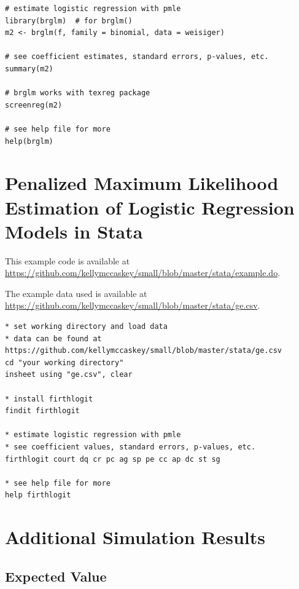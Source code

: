 \documentclass[12pt]{article}
\begin{document}
\begin{appendix}
\begin{footnotesize}
\begin{verbatim}
# estimate logistic regression with pmle
library(brglm)  # for brglm()
m2 <- brglm(f, family = binomial, data = weisiger)

# see coefficient estimates, standard errors, p-values, etc.
summary(m2)

# brglm works with texreg package
screenreg(m2)

# see help file for more
help(brglm)
\end{verbatim}
\end{footnotesize}

\section{Penalized Maximum Likelihood Estimation of Logistic Regression Models in Stata}\label{sec:pmle-in-stata}

This example code is available at \href{https://github.com/kellymccaskey/small/blob/master/stata/example.do}{https://github.com/kellymccaskey/small/blob/master/stata/example.do}.

\noindent The example data used is available at \href{https://github.com/kellymccaskey/small/blob/master/stata/GE.dta}{https://github.com/kellymccaskey/small/blob/master/stata/ge.csv}.

\begin{footnotesize}
\begin{verbatim}
* set working directory and load data
* data can be found at https://github.com/kellymccaskey/small/blob/master/stata/ge.csv
cd "your working directory"
insheet using "ge.csv", clear

* install firthlogit
findit firthlogit

* estimate logistic regression with pmle 
* see coefficient values, standard errors, p-values, etc.
firthlogit court dq cr pc ag sp pe cc ap dc st sg 

* see help file for more 
help firthlogit

\end{verbatim}
\end{footnotesize}


\section{Additional Simulation Results}\label{sec:app-sims}

\subsection{Expected Value}


\end{appendix}
\end{document}
